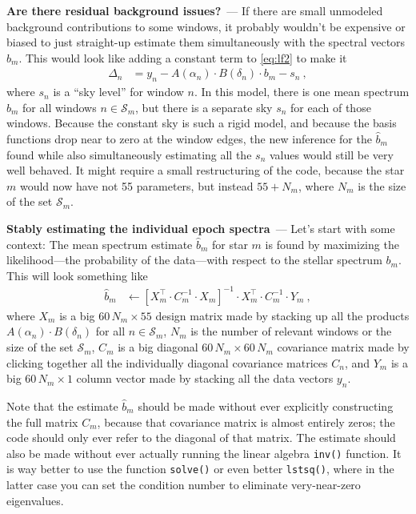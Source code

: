 \documentclass[11pt]{article}
\renewcommand{\paragraph}[1]{\medskip\par\noindent\textbf{#1}~---}
\begin{document}
\paragraph{Are there residual background issues?}
If there are small unmodeled background contributions to some windows, it probably wouldn't be expensive or biased to just straight-up estimate them simultaneously with the spectral vectors $\hat{b}_m$.
This would look like adding a constant term to \eqref{eq:lf2} to make it
\begin{align}
    \Delta_n &= y_n - A(\alpha_n)\cdot B(\delta_n)\cdot b_m - s_n~,
\end{align}
where $s_n$ is a ``sky level'' for window $n$.
In this model, there is one mean spectrum $b_m$ for all windows $n\in\mathscr{S}_m$, but there is a separate sky $s_n$ for each of those windows.
Because the constant sky is such a rigid model, and because the basis functions drop near to zero at the window edges, the new inference for the $\hat{b}_m$ found while also simultaneously estimating all the $s_n$ values would still be very well behaved.
It might require a small restructuring of the code, because the star $m$ would now have not 55 parameters, but instead $55+N_m$, where $N_m$ is the size of the set $\mathscr{S}_m$.

\paragraph{Stably estimating the individual epoch spectra}
Let's start with some context: The mean spectrum estimate $\hat{b}_m$ for star $m$ is found by maximizing the likelihood---the probability of the data---with respect to the stellar spectrum $b_m$.
This will look something like
\begin{align}
  \hat{b}_m &\leftarrow [X_m^\top\cdot C_m^{-1}\cdot X_m]^{-1}\cdot X_m^\top\cdot C_m^{-1}\cdot Y_m ~,
\end{align}
where $X_m$ is a big $60\,N_m\times 55$ design matrix made by stacking up all the products $A(\alpha_n)\cdot B(\delta_n)$ for all $n\in\mathscr{S}_m$,
$N_m$ is the number of relevant windows or the size of the set $\mathscr{S}_m$,
$C_m$ is a big diagonal $60\,N_m\times 60\,N_m$ covariance matrix made by clicking together all the individually diagonal covariance matrices $C_n$,
and $Y_m$ is a big $60\,N_m\times 1$ column vector made by stacking all the data vectors $y_n$.

Note that the estimate $\hat{b}_m$ should be made without ever explicitly constructing the full matrix $C_m$, because that covariance matrix is almost entirely zeros; the code should only ever refer to the diagonal of that matrix.
The estimate should also be made without ever actually running the linear algebra \texttt{inv()} function.
It is way better to use the function \texttt{solve()} or even better \texttt{lstsq()}, where in the latter case you can set the condition number to eliminate very-near-zero eigenvalues.
\end{document}
